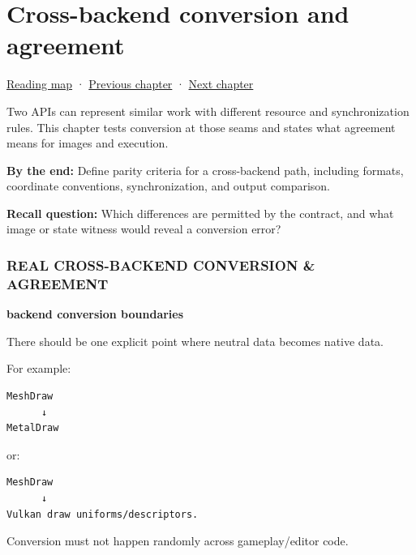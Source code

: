\chapter{Cross-backend conversion and agreement}\label{06-engine-ii-ch044-cross-backend-conversion-and-agreement}\hypertarget{06-engine-ii-ch044}{}\label{stagechapter:06-engine-ii-ch044}

\hypertarget{06-engine-ii-ch044-cross-backend-conversion-and-agreement}{}

\hyperref[volume-reading-map]{Reading map} · \hyperref[06-engine-ii-ch043-compiling-renderer-intent-into-backend-work]{Previous chapter} · \hyperref[06-engine-ii-ch045-rasterizing-kernels-and-connecting-world-identity]{Next chapter}

Two APIs can represent similar work with different resource and synchronization rules. This chapter tests conversion at those seams and states what agreement means for images and execution.

\textbf{By the end:} Define parity criteria for a cross-backend path, including formats, coordinate conventions, synchronization, and output comparison.

\textbf{Recall question:} Which differences are permitted by the contract, and what image or state witness would reveal a conversion error?

\subsection{REAL CROSS-BACKEND CONVERSION \& AGREEMENT}\label{06-engine-ii-ch044-real-cross-backend-conversion-agreement}

\hypertarget{06-engine-ii-ch044-real-cross-backend-conversion-agreement}{}

\textbf{backend conversion boundaries}

There should be one explicit point where neutral data becomes native data.

For example:

\begin{verbatim}
MeshDraw
      ↓
MetalDraw
\end{verbatim}

or:

\begin{verbatim}
MeshDraw
      ↓
Vulkan draw uniforms/descriptors.
\end{verbatim}

Conversion must not happen randomly across gameplay/editor code.

